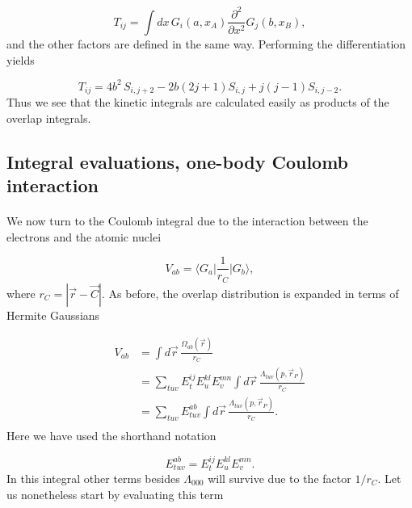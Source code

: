 \documentclass[%
twoside,                 %
final,                   %
10pt]{article}
\begin{document}
\begin{equation}
 T_{ij} = \int dx \,G_i(a,x_A)\frac{\partial^2}{\partial x^2}G_j(b,x_B),
\end{equation}
and the other factors are defined in the same way. Performing the differentiation yields

\begin{equation}
 T_{ij} = 4b^2\,S_{i,j+2} - 2b(2j + 1)S_{i,j} + j(j-1)S_{i,j-2}.
\end{equation}
Thus we see that the kinetic integrals are calculated easily as products of the overlap integrals.



\subsection*{Integral evaluations, one-body Coulomb interaction}

\paragraph{}

We now turn to the Coulomb integral due to the interaction between the electrons and the atomic nuclei

\begin{equation}
 V_{ab} = \langle G_a\vert\frac{1}{r_C}\vert G_b\rangle,
\end{equation}
where $r_C = |\vec r - \vec C|$. As before, the overlap distribution is expanded in terms of  Hermite Gaussians

\begin{equation}
\begin{split}
 V_{ab} & = \int d\vec r \,\frac{\Omega_{ab}(\vec r)}{r_C} \\
        & = \sum_{tuv}E^{ij}_t E^{kl}_u E^{mn}_v\int d\vec r \, \frac{\Lambda_{tuv}(p,\vec r_P)}{r_C} \\
        & = \sum_{tuv}E^{ab}_{tuv}\int d\vec r \, \frac{\Lambda_{tuv}(p,\vec r_P)}{r_C}. \\
\end{split}
\end{equation}
Here we have used the shorthand notation

\begin{equation}
 E^{ab}_{tuv} = E^{ij}_t E^{kl}_u E^{mn}_v.
\end{equation}
In this integral other terms besides $\Lambda_{000}$ will survive due to the factor $1/r_C$. Let us nonetheless start by evaluating this term
\end{document}
